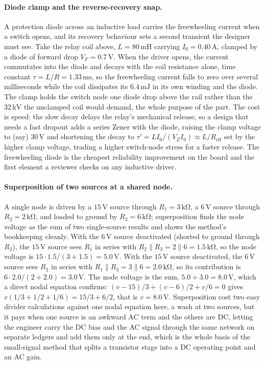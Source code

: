 \paragraph{Diode clamp and the reverse-recovery snap.}
A protection diode across an inductive load carries the freewheeling current
when a switch opens, and its recovery behaviour sets a second transient the
designer must see. Take the relay coil above, $L = 80\,\si{\milli\henry}$
carrying $I_0 = 0.40\,\si{\ampere}$, clamped by a diode of forward drop
$V_F = 0.7\,\si{\volt}$. When the driver opens, the current commutates into
the diode and decays with the coil resistance alone, time constant $\tau =
L/R = 1.33\,\si{\milli\second}$, so the freewheeling current falls to zero
over several milliseconds while the coil dissipates its $6.4\,\si{\milli
\joule}$ in its own winding and the diode. The clamp holds the switch node
one diode drop above the rail rather than the $32\,\si{\kilo\volt}$ the
unclamped coil would demand, the whole purpose of the part. The cost is
speed: the slow decay delays the relay's mechanical release, so a design that
needs a fast dropout adds a series Zener with the diode, raising the clamp
voltage to (say) $30\,\si{\volt}$ and shortening the decay to $\tau' =
L I_0/(V_Z I_0) \approx L/R_{\text{eff}}$ set by the higher clamp voltage,
trading a higher switch-node stress for a faster release. The freewheeling
diode is the cheapest reliability improvement on the board and the first
element a reviewer checks on any inductive driver.

\paragraph{Superposition of two sources at a shared node.}
A single node is driven by a $15\,\si{\volt}$ source through $R_1 = 3\,\si{
\kilo\ohm}$, a $6\,\si{\volt}$ source through $R_2 = 2\,\si{\kilo\ohm}$, and
loaded to ground by $R_3 = 6\,\si{\kilo\ohm}$; superposition finds the node
voltage as the sum of two single-source results and shows the method's
bookkeeping cleanly. With the $6\,\si{\volt}$ source deactivated (shorted to
ground through $R_2$), the $15\,\si{\volt}$ source sees $R_1$ in series with
$R_2\parallel R_3 = 2\parallel 6 = 1.5\,\si{\kilo\ohm}$, so the node voltage is
$15\cdot 1.5/(3 + 1.5) = 5.0\,\si{\volt}$. With the $15\,\si{\volt}$ source
deactivated, the $6\,\si{\volt}$ source sees $R_2$ in series with $R_1\parallel
R_3 = 3\parallel 6 = 2.0\,\si{\kilo\ohm}$, so its contribution is $6\cdot 2.0/
(2 + 2.0) = 3.0\,\si{\volt}$. The node voltage is the sum, $5.0 + 3.0 =
8.0\,\si{\volt}$, which a direct nodal equation confirms: $(v-15)/3 + (v-6)/2 +
v/6 = 0$ gives $v(1/3 + 1/2 + 1/6) = 15/3 + 6/2$, that is $v = 8.0\,\si{\volt}$.
Superposition cost two easy divider calculations against one nodal equation
here, a wash at two sources, but it pays when one source is an awkward AC term
and the others are DC, letting the engineer carry the DC bias and the AC signal
through the same network on separate ledgers and add them only at the end, which
is the whole basis of the small-signal method that splits a transistor stage
into a DC operating point and an AC gain.

